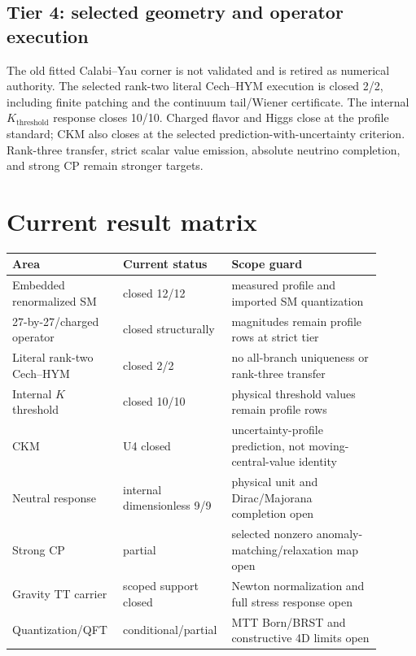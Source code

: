 \documentclass[11pt]{article}
\begin{document}
\subsection{Tier 4: selected geometry and operator execution}

The old fitted Calabi--Yau corner is not validated and is retired as numerical
authority. The selected rank-two literal Cech--HYM execution is closed 2/2,
including finite patching and the continuum tail/Wiener certificate. The
internal $K_{\mathrm{threshold}}$ response closes 10/10. Charged flavor and
Higgs close at the profile standard; CKM also closes at the selected
prediction-with-uncertainty criterion. Rank-three transfer, strict scalar value
emission, absolute neutrino completion, and strong CP remain stronger targets.

\section{Current result matrix}

\begin{center}
\begin{tabular}{p{0.29\linewidth}p{0.22\linewidth}p{0.39\linewidth}}
\toprule
Area & Current status & Scope guard \\
\midrule
Embedded renormalized SM & closed 12/12 & measured profile and imported SM
quantization \\
27-by-27/charged operator & closed structurally & magnitudes remain profile
rows at strict tier \\
Literal rank-two Cech--HYM & closed 2/2 & no all-branch uniqueness or
rank-three transfer \\
Internal $K$ threshold & closed 10/10 & physical threshold values remain
profile rows \\
CKM & U4 closed & uncertainty-profile prediction, not moving-central-value
identity \\
Neutral response & internal dimensionless 9/9 & physical unit and
Dirac/Majorana completion open \\
Strong CP & partial & selected nonzero anomaly-matching/relaxation map open \\
Gravity TT carrier & scoped support closed & Newton normalization and full
stress response open \\
Quantization/QFT & conditional/partial & MTT Born/BRST and constructive 4D
limits open \\
\bottomrule
\end{tabular}
\end{center}
\end{document}
